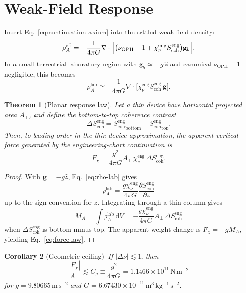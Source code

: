 \documentclass[11pt]{article}
\numberwithin{equation}{section}
\newtheorem{theorem}{Theorem}[section]
\newtheorem{corollary}[theorem]{Corollary}
\theoremstyle{remark}
\newcommand{\chieng}{\chi_\nu^{\mathrm{eng}}}
\newcommand{\scoheng}{S_{\mathrm{coh}}^{\mathrm{eng}}}
\newcommand{\nuoph}{\nu_{\mathrm{OPH}}}
\newcommand{\gbar}{\mathbf g_b}
\newcommand{\dd}{\,\mathrm d}
\newcommand{\rhoa}{\rho_A}
\newcommand{\Cgeom}{C_g}
\begin{document}
\section{Weak-Field Response}

Insert Eq.~\eqref{eq:continuation-axiom} into the settled weak-field density:
\begin{equation}
\rhoa^{\mathrm{eff}}
=
-\frac{1}{4\pi G}
\nabla\cdot
\Bigl[
\bigl(\nuoph-1+\chieng\scoheng\bigr)\gbar
\Bigr].
\label{eq:rho-eff}
\end{equation}
In a small terrestrial laboratory region with \(\gbar\simeq -g\,\hat z\) and
canonical \(\nuoph-1\) negligible, this becomes
\begin{equation}
\rhoa^{\mathrm{lab}}
\simeq
-\frac{1}{4\pi G}
\nabla\cdot
\bigl[\chieng\scoheng\,\mathbf g\bigr].
\label{eq:rho-lab}
\end{equation}

\begin{theorem}[Planar response law]
Let a thin device have horizontal projected area \(A_\perp\), and define the
bottom-to-top coherence contrast
\[
\Delta\scoheng={\scoheng}_{\mathrm{bottom}}-{\scoheng}_{\mathrm{top}}.
\]
Then, to leading order in the thin-device approximation, the apparent vertical
force generated by the engineering-chart continuation is
\begin{equation}
\boxed{
F_\chi
=
\frac{g^2}{4\pi G}A_\perp\,\chieng\,\Delta\scoheng .
}
\label{eq:force-law}
\end{equation}
\end{theorem}

\begin{proof}
With \(\mathbf g=-g\hat z\), Eq.~\eqref{eq:rho-lab} gives
\[
\rhoa^{\mathrm{lab}}
=
\frac{g\chieng}{4\pi G}\frac{\partial\scoheng}{\partial z}
\]
up to the sign convention for \(z\). Integrating through a thin column gives
\[
M_A=
\int\rhoa^{\mathrm{lab}}\dd V
=
-\frac{g\chieng}{4\pi G}A_\perp\,\Delta\scoheng
\]
when \(\Delta\scoheng\) is bottom minus top. The apparent weight change is
\(F_\chi=-gM_A\), yielding Eq.~\eqref{eq:force-law}.
\end{proof}

\begin{corollary}[Geometric ceiling]
If \(|\Delta\nu|\lesssim 1\), then
\begin{equation}
\frac{|F_\chi|}{A_\perp}
\lesssim
\Cgeom
\equiv
\frac{g^2}{4\pi G}
=
1.1466\times10^{11}\,\mathrm{N\,m^{-2}}
\label{eq:geometric-ceiling}
\end{equation}
for \(g=9.80665\,\mathrm{m\,s^{-2}}\) and
\(G=6.67430\times10^{-11}\,\mathrm{m^3\,kg^{-1}\,s^{-2}}\).
\end{corollary}
\end{document}
